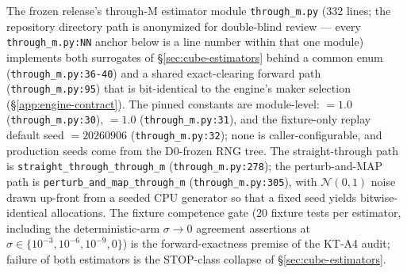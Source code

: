 The frozen release's through-M estimator module \texttt{through\_m.py}
(332 lines; the repository directory path is anonymized for double-blind
review --- every \texttt{through\_m.py:NN} anchor below is a line number
within that one module) implements both
surrogates of \S\ref{sec:cube-estimators} behind a common  enum
(\texttt{through\_m.py:36-40}) and a shared exact-clearing forward path
(\texttt{through\_m.py:95}) that is bit-identical to the engine's maker
selection (\S\ref{app:engine-contract}). The pinned constants are
module-level:  $= 1.0$
(\texttt{through\_m.py:30}),  $= 1.0$
(\texttt{through\_m.py:31}), and the fixture-only replay default seed
 $= 20260906$
(\texttt{through\_m.py:32}); none is caller-configurable, and production
seeds come from the D0-frozen RNG tree. The straight-through path is
\texttt{straight\_through\_through\_m} (\texttt{through\_m.py:278}); the
perturb-and-MAP path is \texttt{perturb\_and\_map\_through\_m}
(\texttt{through\_m.py:305}), with $\mathcal{N}(0,1)$ noise drawn up-front
from a seeded CPU generator so that a fixed seed yields bitwise-identical
allocations. The fixture competence gate (20 fixture tests per estimator,
including the deterministic-arm $\sigma \to 0$ agreement assertions at
$\sigma \in \{10^{-3},10^{-6},10^{-9},0\}$) is the forward-exactness
premise of the KT-A4 audit; failure of both estimators is the STOP-class
collapse of \S\ref{sec:cube-estimators}.
\endgroup
\endinput
